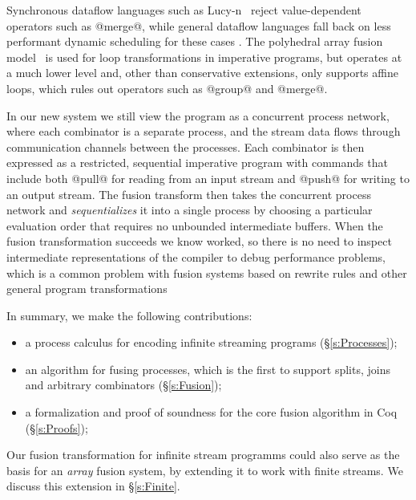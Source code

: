 
Synchronous dataflow languages such as Lucy-n~\cite{mandel2010lucy} reject value-dependent operators such as @merge@, while general dataflow languages fall back on less performant dynamic scheduling for these cases \cite{bouakaz2013real}. The polyhedral array fusion model~\cite{feautrier2011polyhedron} is used for loop transformations in imperative programs, but operates at a much lower level and, other than conservative extensions, only supports affine loops, which rules out operators such as @group@ and @merge@.

In our new system we still view the program as a concurrent process network, where each combinator is a separate process, and the stream data flows through communication channels between the processes. Each combinator is then expressed as a restricted, sequential imperative program with commands that include both @pull@ for reading from an input stream and @push@ for writing to an output stream. The fusion transform then takes the concurrent process network and \emph{sequentializes} it into a single process by choosing a particular evaluation order that requires no unbounded intermediate buffers. When the fusion transformation succeeds we know worked, so there is no need to inspect intermediate representations of the compiler to debug performance problems, which is a common problem with fusion systems based on rewrite rules and other general program transformations \cite{lippmeier2012:guiding}

In summary, we make the following contributions:
\begin{itemize}
\item a process calculus for encoding infinite streaming programs (\S\ref{s:Processes});
\item an algorithm for fusing processes, which is the first to support splits, joins and arbitrary combinators (\S\ref{s:Fusion});
\item a formalization and proof of soundness for the core fusion algorithm in Coq (\S\ref{s:Proofs});
\end{itemize}

Our fusion transformation for infinite stream programms could also serve as the basis for an \emph{array} fusion system, by extending it to work with finite streams. We discuss 
this extension in \S\ref{s:Finite}.

